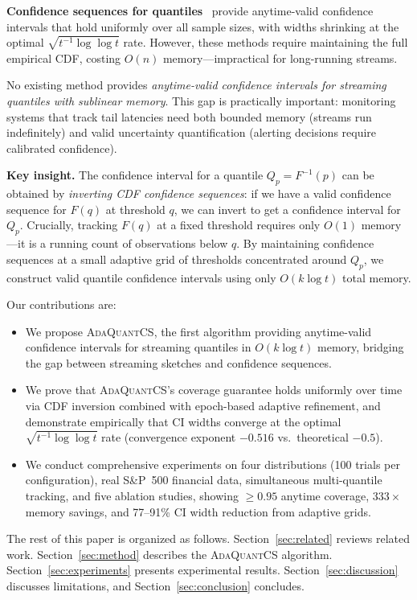 \documentclass{article}
\newcommand{\Qp}{Q_p}
\newcommand{\ours}{\textsc{AdaQuantCS}}
\begin{document}
\textbf{Confidence sequences for quantiles}~\citep{howard2022sequential} provide anytime-valid confidence intervals that hold uniformly over all sample sizes, with widths shrinking at the optimal $\sqrt{t^{-1} \log \log t}$ rate. However, these methods require maintaining the full empirical CDF, costing $O(n)$ memory---impractical for long-running streams.

No existing method provides \emph{anytime-valid confidence intervals for streaming quantiles with sublinear memory}. This gap is practically important: monitoring systems that track tail latencies need both bounded memory (streams run indefinitely) and valid uncertainty quantification (alerting decisions require calibrated confidence).

\textbf{Key insight.} The confidence interval for a quantile $\Qp = F^{-1}(p)$ can be obtained by \emph{inverting CDF confidence sequences}: if we have a valid confidence sequence for $F(q)$ at threshold $q$, we can invert to get a confidence interval for $\Qp$. Crucially, tracking $F(q)$ at a fixed threshold requires only $O(1)$ memory---it is a running count of observations below $q$. By maintaining confidence sequences at a small adaptive grid of thresholds concentrated around $\Qp$, we construct valid quantile confidence intervals using only $O(k \log t)$ total memory.

Our contributions are:
\begin{itemize}
    \item We propose \ours{}, the first algorithm providing anytime-valid confidence intervals for streaming quantiles in $O(k \log t)$ memory, bridging the gap between streaming sketches and confidence sequences.
    \item We prove that \ours{}'s coverage guarantee holds uniformly over time via CDF inversion combined with epoch-based adaptive refinement, and demonstrate empirically that CI widths converge at the optimal $\sqrt{t^{-1}\log\log t}$ rate (convergence exponent $-0.516$ vs.\ theoretical $-0.5$).
    \item We conduct comprehensive experiments on four distributions (100 trials per configuration), real S\&P~500 financial data, simultaneous multi-quantile tracking, and five ablation studies, showing $\geq 0.95$ anytime coverage, $333\times$ memory savings, and 77--91\% CI width reduction from adaptive grids.
\end{itemize}

The rest of this paper is organized as follows. Section~\ref{sec:related} reviews related work. Section~\ref{sec:method} describes the \ours{} algorithm. Section~\ref{sec:experiments} presents experimental results. Section~\ref{sec:discussion} discusses limitations, and Section~\ref{sec:conclusion} concludes.
\end{document}
